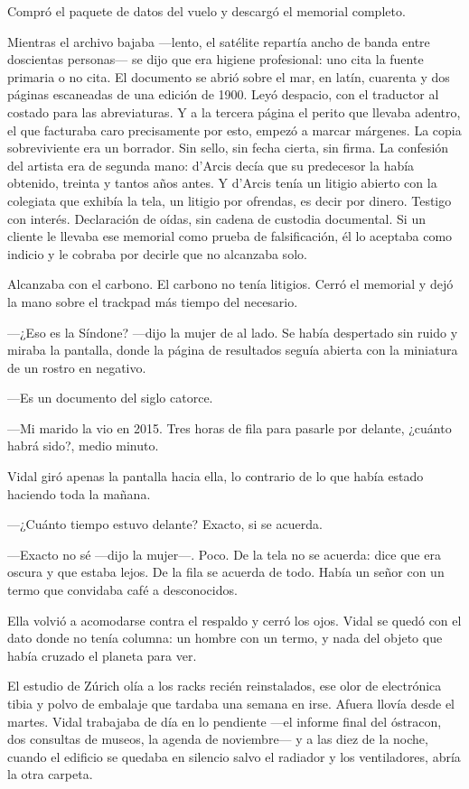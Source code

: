 Compró el paquete de datos del vuelo y descargó el memorial completo.

Mientras el archivo bajaba ---lento, el satélite repartía ancho de banda entre doscientas personas--- se dijo que era higiene profesional: uno cita la fuente primaria o no cita. El documento se abrió sobre el mar, en latín, cuarenta y dos páginas escaneadas de una edición de 1900. Leyó despacio, con el traductor al costado para las abreviaturas. Y a la tercera página el perito que llevaba adentro, el que facturaba caro precisamente por esto, empezó a marcar márgenes. La copia sobreviviente era un borrador. Sin sello, sin fecha cierta, sin firma. La confesión del artista era de segunda mano: d'Arcis decía que su predecesor la había obtenido, treinta y tantos años antes. Y d'Arcis tenía un litigio abierto con la colegiata que exhibía la tela, un litigio por ofrendas, es decir por dinero. Testigo con interés. Declaración de oídas, sin cadena de custodia documental. Si un cliente le llevaba ese memorial como prueba de falsificación, él lo aceptaba como indicio y le cobraba por decirle que no alcanzaba solo.

Alcanzaba con el carbono. El carbono no tenía litigios. Cerró el memorial y dejó la mano sobre el trackpad más tiempo del necesario.

---¿Eso es la Síndone? ---dijo la mujer de al lado. Se había despertado sin ruido y miraba la pantalla, donde la página de resultados seguía abierta con la miniatura de un rostro en negativo.

---Es un documento del siglo catorce.

---Mi marido la vio en 2015. Tres horas de fila para pasarle por delante, ¿cuánto habrá sido?, medio minuto.

Vidal giró apenas la pantalla hacia ella, lo contrario de lo que había estado haciendo toda la mañana.

---¿Cuánto tiempo estuvo delante? Exacto, si se acuerda.

---Exacto no sé ---dijo la mujer---. Poco. De la tela no se acuerda: dice que era oscura y que estaba lejos. De la fila se acuerda de todo. Había un señor con un termo que convidaba café a desconocidos.

Ella volvió a acomodarse contra el respaldo y cerró los ojos. Vidal se quedó con el dato donde no tenía columna: un hombre con un termo, y nada del objeto que había cruzado el planeta para ver.


\scenebreak


El estudio de Zúrich olía a los racks recién reinstalados, ese olor de electrónica tibia y polvo de embalaje que tardaba una semana en irse. Afuera llovía desde el martes. Vidal trabajaba de día en lo pendiente ---el informe final del óstracon, dos consultas de museos, la agenda de noviembre--- y a las diez de la noche, cuando el edificio se quedaba en silencio salvo el radiador y los ventiladores, abría la otra carpeta.

